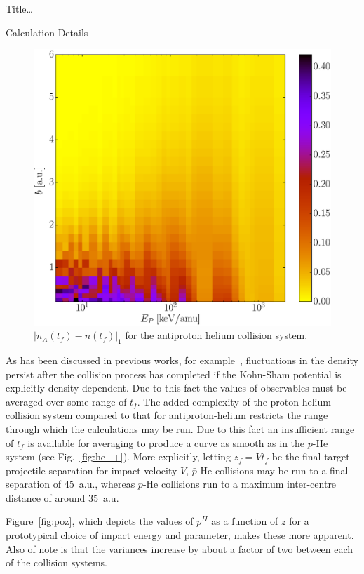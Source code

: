 \documentclass[letterpaper, 10 pt]{report}
\begin{document}
\begin{chapter}{ Title\dots \label{chap:p-he2p-he}}
\begin{section}{Calculation Details \label{sec:phe2p-det}}
\begin{figure}[ht]
\begin{minipage}{.49\linewidth}
            \centering
            \includegraphics[width = \linewidth]{./images/dendiff.eps}
            \caption[Density difference]
                   {$\left| n_A\left(t_f \right) - n\left(t_f\right)\right|_1$ for the antiproton
                    helium collision system. \label{fig:l1}}
         \end{minipage}
      \end{figure}

      As has been discussed in previous works, for example~\cite{microresp,pbarhe}, fluctuations in the
      density persist after the collision process has completed if the Kohn-Sham potential is explicitly
      density dependent. Due to this fact the values of observables must be averaged over some range of
      $t_f$. The added complexity of the proton-helium collision system compared to that for
      antiproton-helium restricts the range through which the calculations may be run. Due to this fact
      an insufficient range of $t_f$ is available for averaging to produce a curve as smooth as in the
      $\bar{p}$-He system (see Fig.~\ref{fig:he++}). More explicitly, letting $z_f = V t_f$ be the final
      target-projectile separation for impact velocity $V$, $\bar{p}$-He collisions may be run to a
      final separation of 45~a.u., whereas $p$-He collisions run to a maximum inter-centre distance of
      around 35~a.u.
      
      Figure~\ref{fig:poz}, which depicts the values of $p^{II}$ as a function of $z$ for a prototypical
      choice of impact energy and parameter, makes these more apparent. Also of note is that the
      variances increase by about a factor of two between each of the collision systems.


\end{section}
\end{chapter}
\end{document}
